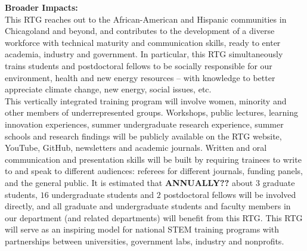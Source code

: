 \documentclass[11pt]{NSFamsart}
\begin{document}
\noindent\textbf{\Large{Broader Impacts:}} \\
This RTG reaches out to the African-American and Hispanic communities in Chicagoland and beyond, and contributes to the development of a diverse workforce with technical maturity and communication skills, ready to enter academia, industry and government. In particular, this RTG simultaneously trains students and postdoctoral fellows to be socially responsible for our environment, health and new energy resources -- with knowledge to better appreciate climate change, new energy, social issues, etc. \\

\noindent This vertically integrated training program will involve women, minority and other members of underrepresented groups. Workshops, public lectures, learning innovation experiences, summer undergraduate research experience, summer schools and research findings will be publicly available on the  RTG website, YouTube, GitHub, newsletters and academic journals. Written and oral communication and presentation skills will be built by requiring trainees to write to and speak to different audiences: referees for different journals, funding panels, and the general public.  It is estimated that {\bf ANNUALLY??} about $3$ graduate students, $16$ undergraduate students and $2$ postdoctoral fellows will be involved directly, and all graduate and undergraduate students and faculty members in our department (and related departments) will benefit from this RTG.  This RTG will serve as an inspiring model for national STEM  training programs with partnerships between universities, government labs, industry and nonprofits. 
%
\thispagestyle{empty}
%
\end{document}
